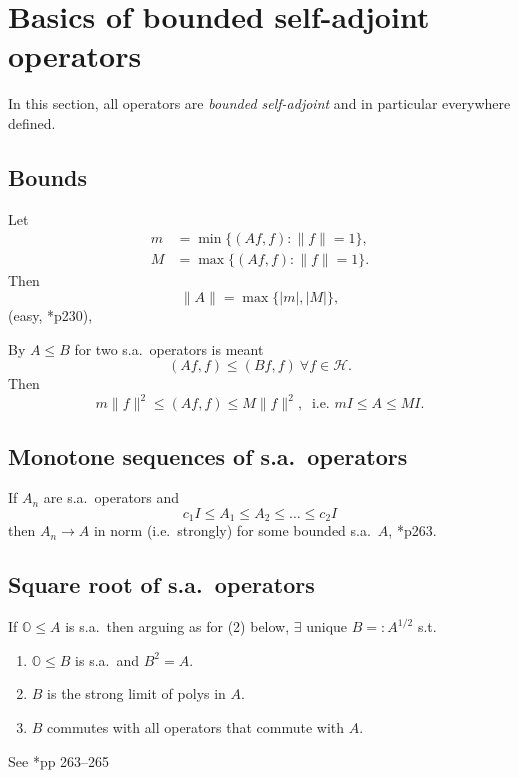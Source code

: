 \documentclass[a4paper]{amsart}
\theoremstyle{plain}
\theoremstyle{definition}
\theoremstyle{remark}
\begin{document}
\section{\textbf{Basics of bounded self-adjoint operators}}

In this section,  all operators are \emph{bounded self-adjoint} and in particular  everywhere defined.

\subsection{Bounds}  \label{secbd} Let
\begin{align*}
m &= \min \{ (Af,f) : \| f \| = 1 \}, \\
M &= \max \{ (Af,f) : \| f \| = 1 \}.
\end{align*}
Then
\[
\| A \| = \max \{ |m|, |M| \},
\]
(easy, \cite{RN}*{p230}),


\medskip By $ A \leq B $ for two s.a.\ operators is meant
\[
(Af,f) \leq (Bf,f)\ \forall f \in \mathcal{H} .
\]
Then
\[
m \| f \|^2 \leq (Af,f) \leq M \|f\|^2,\ \text{ i.e. } m I \leq A \leq MI .
\]

 

\subsection{Monotone sequences of s.a.\ operators}\label{secms}
If $ A_n $ are s.a.\ operators and 
\[
c_1 I \leq A_1 \leq A_2 \leq  \dots \leq c_2 I 
\]
then
$ A_n \to A $ in norm (i.e.\ strongly) for some bounded s.a.\ $ A $, \cite{RN}*{p263}.


\subsection{Square root of s.a.\ operators}
If $ \mathbb{O} \leq A $ is s.a.\ then arguing as for (2) below, $ \exists $ unique $ B =: A^{1/2} $ s.t.
\begin{enumerate}

\item $  \mathbb{O} \leq B $ is s.a.\ and $ B^2 = A $.
\item $ B $ is the strong limit of polys  in $ A $.
\item $ B $ commutes with all operators that commute with $ A $.
\end{enumerate}
See \cite{RN}*{pp 263--265}
\end{document}
